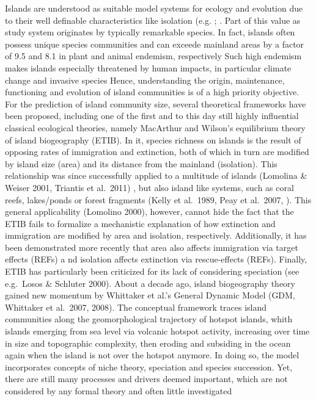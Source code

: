 \documentclass[a4paper]{scrartcl}
\begin{document}
Islands are understood as suitable model systems for ecology and evolution due to their well definable characteristics
like isolation (e.g. \cite{lososAdaptationDiversificationIslands2009b}; \cite{warrenIslandsModelSystems}.
Part of this value as study system originates by typically remarkable species.
In fact, islands often possess unique species communities and can exceede mainland areas
by a factor of 9.5 and 8.1 in plant and animal  endemism, respectively \cite{kierGlobalAssessmentEndemism2009}
Such high endemism makes islands  especially threatened by human impacts, in particular climate change and invasive species \cite{fordhamWhyTropicalIsland2010}
Hence, understanding the origin, maintenance, functioning and evolution of island communities is of a high priority objective.
For the prediction of island community size, several theoretical frameworks have been proposed,
including one of the first and to this day still highly influential classical ecological theories,
namely MacArthur and Wilson's equilibrium theory of island biogeography (ETIB). %
In it, species richness on islands is the result of opposing rates of immigration and extinction,
both of which in turn are modified by island size (area) and its distance from the mainland (isolation).
This relationship was since successfully applied to a multitude of islands (Lomolina \& Weiser 2001, Triantis et al.\ 2011)%
, but also island like systems, such as coral reefs, lakes/ponds or forest fragments (Kelly et al.\ 1989, Peay et al.\ 2007, ). %
This general applicability (Lomolino 2000), however, cannot hide the fact
that the ETIB fails to formalize a mechanistic explanation of how extinction and immigration are modified by area and isolation, respectively.
Additionally, it has been demonstrated more recently that area also affects immigration via target effects (REFs) a
nd isolation affects extinction via rescue-effects (REFs).
Finally, ETIB has particularly been criticized for its lack of considering speciation (see e.g.\ Losos \& Schluter 2000). %
About a decade ago, island biogeography theory gained new momentum by Whittaker et al.'s General Dynamic Model (GDM, Whittaker et al.\ 2007, 2008). %
The conceptual framework traces island communities along the geomorphological trajectory of hotspot islands,
whith islands emerging from sea level via volcanic hotspot activity,
increasing over time in size and topographic complexity,
then eroding and subsiding in the ocean again when the island is not over the hotspot anymore.
In doing so, the model incorporates concepts of niche theory, speciation and species succession.
Yet, there are still many processes and drivers deemed important,
which are not considered by any formal theory and often little investigated
\end{document}
